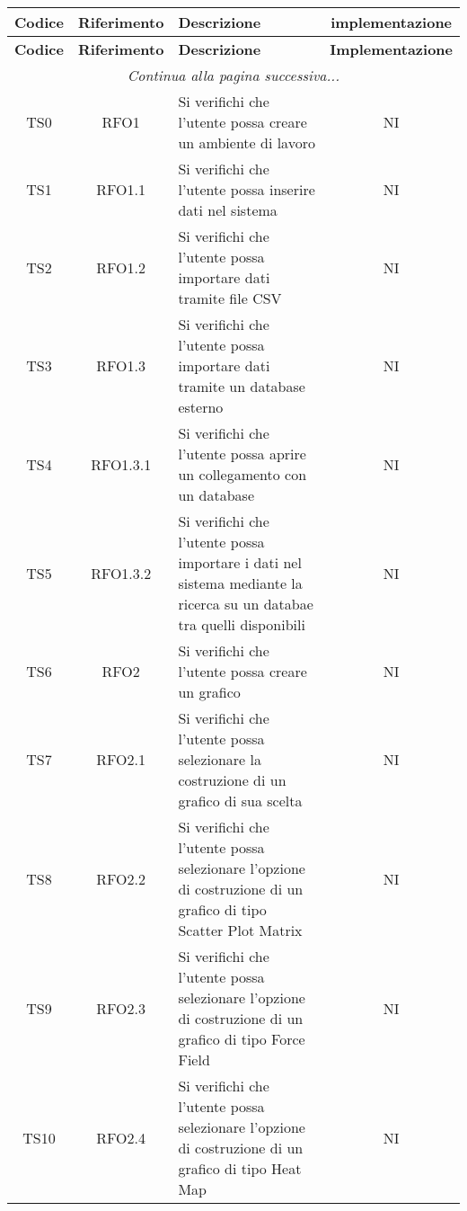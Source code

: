 \documentclass[../piano_di_qualifica.tex]{subfiles}
\begin{document}
\begin{center}
	\begin{longtable}{|c|c|p{8cm}|c|}
		\hline
		\rowcolor{lightgray}
		{\textbf{Codice}} & {\textbf{Riferimento}} & {\textbf{Descrizione}} & {\textbf{implementazione}} \\
		\hline
		\endfirsthead
		\hline
		\rowcolor{lightgray}
		{\textbf{Codice}} & {\textbf{Riferimento}} & {\textbf{Descrizione}} & {\textbf{Implementazione}} \\
		\hline
		\endhead
		
		\hline
		\multicolumn{4}{|c|}{\emph{Continua alla pagina successiva...}} \\
		\hline
		\endfoot
		\endlastfoot

		TS0   & RFO1            & Si verifichi che l'utente possa creare un ambiente di lavoro     & NI                         \\
		TS1   & RFO1.1          & Si verifichi che l'utente possa inserire dati nel sistema & NI                         \\
		TS2   & RFO1.2 			& Si verifichi che l'utente possa importare dati tramite file CSV         & NI                         \\
		TS3   & RFO1.3          & Si verifichi che l'utente possa importare dati tramite un database esterno   & NI                  \\
		TS4   & RFO1.3.1      	& Si verifichi che l'utente possa aprire un collegamento con un database & NI                         \\
		TS5   & RFO1.3.2      	& Si verifichi che l'utente possa importare i dati nel sistema mediante la ricerca su un databae tra quelli disponibili & NI  \\
		TS6   & RFO2      		& Si verifichi che l'utente possa creare  un grafico & NI  \\
		TS7   & RFO2.1      	& Si verifichi che l'utente possa selezionare la costruzione di un grafico di sua scelta & NI  \\
		TS8   & RFO2.2      	& Si verifichi che l'utente possa selezionare l'opzione di costruzione di un grafico di tipo Scatter Plot Matrix & NI  \\
		TS9   & RFO2.3     		& Si verifichi che l'utente possa selezionare l'opzione di costruzione di un grafico di tipo Force Field & NI  \\
		TS10  & RFO2.4     		& Si verifichi che l'utente possa selezionare l'opzione di costruzione di un grafico di tipo Heat Map & NI  \\

\end{longtable}
\end{center}
\end{document}
